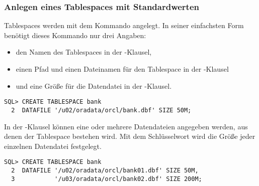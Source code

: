         \subsubsection{Anlegen eines Tablespaces mit Standardwerten}
          Tablespaces werden mit dem Kommando  angelegt. In seiner einfachsten Form ben\"otigt dieses Kommando nur drei Angaben:
          \begin{itemize}
            \item den Namen des Tablespaces in der -Klausel,
            \item einen Pfad und einen Dateinamen f\"ur den Tablespace in der -Klausel
            \item und eine Gr\"o\ss{}e f\"ur die Datendatei in der -Klausel.
          \end{itemize}
          \begin{lstlisting}[caption={Das \languageorasql{CREATE TABLESPACE}-Kommando},label=admin103,language=oracle_sql]
SQL> CREATE TABLESPACE bank
  2  DATAFILE '/u02/oradata/orcl/bank.dbf' SIZE 50M;
          \end{lstlisting}
          \begin{merke}
            In der -Klausel k\"onnen eine oder mehrere Datendateien angegeben werden, aus denen der Tablespace bestehen wird. Mit dem Schl\"usselwort  wird die Gr\"o\ss{}e jeder einzelnen Datendatei festgelegt.
          \end{merke}
          \begin{lstlisting}[caption={Ein Tablespace mit mehreren Datendateien},label=admin104,language=oracle_sql]
SQL> CREATE TABLESPACE bank
  2  DATAFILE '/u02/oradata/orcl/bank01.dbf' SIZE 50M,
  3           '/u03/oradata/orcl/bank02.dbf' SIZE 200M;
          \end{lstlisting}
